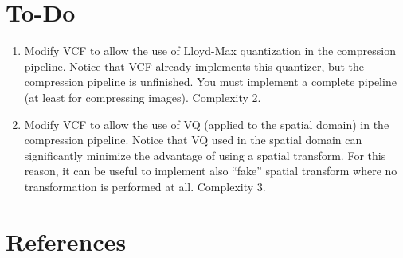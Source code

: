 \section{To-Do}
\begin{enumerate}
\item Modify VCF to allow the use of Lloyd-Max quantization in the
  compression pipeline. Notice that VCF already implements this
  quantizer, but the compression pipeline is unfinished. You must
  implement a complete pipeline (at least for compressing
  images). Complexity 2.
\item Modify VCF to allow the use of VQ (applied to the spatial
  domain) in the compression pipeline. Notice that VQ used in the
  spatial domain can significantly minimize the advantage of using a
  spatial transform. For this reason, it can be useful to implement
  also ``fake'' spatial transform where no transformation is performed
  at all. Complexity 3.
\end{enumerate}

\section{References}

\renewcommand{\addcontentsline}[3]{}%

